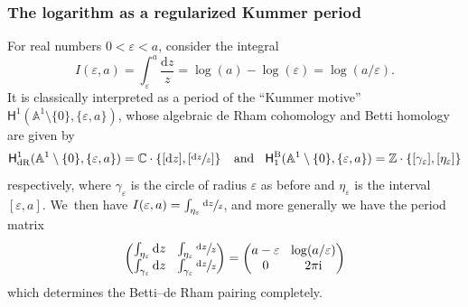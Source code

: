 \documentclass[10pt]{amsart}
\let\oldbullet\bullet
\renewcommand{\bullet}{{\raisebox{1pt}{$\scriptscriptstyle\oldbullet$}}}
\newcommand{\dslog}[1]{\sfrac{\dd#1}{#1}}
\theoremstyle{definition}
\theoremstyle{remark}
\newcommand{\CC}{\mathbb{C}}
\newcommand{\ZZ}{\mathbb{Z}}
\newcommand{\AF}{\mathbb{A}}
\newcommand{\iu}{\mathrm{i}}
\newcommand{\ipi}{\pi\iu }
\newcommand{\tipi}{2\ipi}
\let\epsilon\varepsilon
\newcommand{\rbrac}[1]{\left(#1\right)}
\newcommand{\sbrac}[1]{\left[#1\right]}
\newcommand{\cbrac}[1]{\left\{#1\right\}}
\newcommand{\dd}{\mathrm{d}}
\newcommand{\dlog}[1]{\frac{\dd#1}{#1}}
\newcommand{\coH}[2][\bullet]{\mathsf{H}^{#1}\rbrac{#2}}
\newcommand{\HdR}[2][\bullet]{\mathsf{H}_{\mathrm{dR}}^{#1}(#2)}
\newcommand{\HlgyB}[2][\bullet]{\mathsf{H}^{\mathrm{B}}_{#1}(#2)}
\begin{document}
\subsubsection{The logarithm as a regularized Kummer period}\label{sec:kummers}
For real numbers $0 < \epsilon < a$, consider the integral
\[
I(\epsilon,a) = \int_\epsilon^a \dlog{z} = \log(a) - \log(\epsilon) = \log(a/\epsilon).
\]
It is classically interpreted as a period of the ``Kummer motive'' $\coH[1]{\AF^1\setminus \{0\},\{\epsilon,a\}}$, whose algebraic de Rham cohomology and Betti homology are given by
\[
\HdR[1]{\AF^1\setminus\{0\},\{\epsilon,a\}} = \CC \cdot \cbrac{[\dd z],\sbrac{\dslog{z}}} \;\; \mbox{ and } \;\;
\HlgyB[1]{\AF^1\setminus\{0\},\{\epsilon,a\}} = \ZZ \cdot \{ [\gamma_\epsilon], [\eta_\epsilon] \}
\]
respectively, where $\gamma_\epsilon$ is the circle of radius $\epsilon$ as before and $\eta_\epsilon$ is the interval $[\epsilon,a]$. We~then have $I(\epsilon,a) = \int_{\eta_\epsilon}\dslog{z}$, and more generally we have the period matrix
\[\arraycolsep4.5pt
\begin{pmatrix}
\int_{\eta_\epsilon} \dd z & \int_{\eta_\epsilon} \dslog{z} \\
\int_{\gamma_\epsilon} \dd z & \int_{\gamma_\epsilon} \dslog{z}
\end{pmatrix} = \begin{pmatrix}
a-\epsilon & \log(a/\epsilon)\\
0 & \tipi
\end{pmatrix}
\]
which determines the Betti--de Rham pairing completely.
\end{document}

